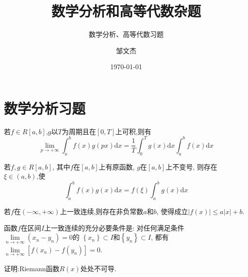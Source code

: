 \documentclass[lang=cn,newtx,10pt,scheme=chinese]{../Template/elegantbook}
\title{数学分析和高等代数杂题}
\subtitle{数学分析、高等代数习题}
\author{邹文杰}
\institute{无}
\date{\today}
\begin{document}
\maketitle
\frontmatter

\tableofcontents

\mainmatter%


\chapter{数学分析习题}

\begin{lemma}[Riemann 引理] \label{thm:Riemann}
若$f\in R\left[ a,b \right] $,$g$以$T$为周期且在$\left[ 0,T \right] $上可积,则有
\begin{equation}
\underset{p\rightarrow +\infty}{\lim}\int_a^b{f\left( x \right) g\left( px \right) \mathrm{d}x=\frac{1}{T}}\int_0^T{g\left( x \right) \mathrm{d}x}\int_a^b{f\left( x \right) \mathrm{d}x}
\end{equation}
\end{lemma}

\begin{theorem}[积分第一中值定理的推广] \label{thm:JFdyZZ}
若$f,g\in R\left[ a,b \right] $,
其中$f$在$\left[ a,b \right] $上有原函数,
$g$在$\left[ a,b \right] $上不变号,
则存在$\xi \in \left( a,b \right) $,使
\begin{equation}
\int_a^b{f\left( x \right) g\left( x \right) \mathrm{d}x}=f\left( \xi \right) \int_a^b{g\left( x \right) \mathrm{d}x}
\end{equation}
\end{theorem}

\begin{proposition} \label{pro:YZLXHS}
若$f$在$\left( -\infty ,+\infty \right) $上一致连续,则存在非负常数$a$和$b$,
使得成立$\left| f\left( x \right) \right|\leqslant a\left| x \right|+b$.
\end{proposition}

\begin{proposition} \label{pro:HSYZLXCYTJ}
函数$f$在区间$I$上一致连续的充分必要条件是:
对任何满足条件$\underset{n\rightarrow +\infty}{\lim}\left( x_n-y_n \right) =0$的
$\left\{ x_n \right\} \subset I$和$\left\{ y_n \right\} \subset I$,
都有$\underset{n\rightarrow +\infty}{\lim}\left[ f\left( x_n \right) -f\left( y_n \right) \right] =0$.
\end{proposition}


\newpage


\begin{example}
证明:Riemann函数$R(x)$处处不可导.
\end{example}
\end{document}
